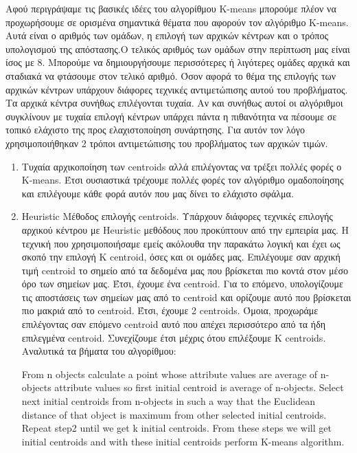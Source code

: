 Αφού περιγράψαμε τις βασικές ιδέες του αλγορίθμου K-means μπορούμε πλέον να προχωρήσουμε σε ορισμένα σημαντικά θέματα που αφορούν τον αλγόριθμο K-means. Αυτά είναι ο αριθμός των ομάδων, η επιλογή των αρχικών κέντρων και ο τρόπος υπολογισμού της απόστασης.Ο τελικός αριθμός των ομάδων στην περίπτωση μας είναι ίσος με 8. Μπορούμε να δημιουργήσουμε περισσότερες ή λιγότερες ομάδες αρχικά και σταδιακά να φτάσουμε στον τελικό αριθμό. Όσον αφορά το θέμα της επιλογής των αρχικών κέντρων υπάρχουν διάφορες τεχνικές αντιμετώπισης αυτού του προβλήματος. Τα αρχικά κέντρα συνήθως επιλέγονται τυχαία. Αν και συνήθως αυτοί οι αλγόριθμοι συγκλίνουν με τυχαία επιλογή κέντρων υπάρχει πάντα η πιθανότητα να πέσουμε σε τοπικό ελάχιστο της προς ελαχιστοποίηση συνάρτησης. Για αυτόν τον λόγο χρησιμοποιήθηκαν 2 τρόποι αντιμετώπισης του προβλήματος των αρχικών τιμών.
\begin{enumerate}
    \item Τυχαία αρχικοποίηση των centroids αλλά επιλέγοντας να τρέξει πολλές φορές ο K-means. Έτσι ουσιαστικά τρέχουμε πολλές φορές τον αλγόριθμο ομαδοποίησης και επιλέγουμε κάθε φορά αυτόν που μας δίνει το ελάχιστο σφάλμα.

    \item Heuristic Μέθοδος επιλογής centroids.
    Υπάρχουν διάφορες τεχνικές επιλογής αρχικού κέντρου με Heuristic μεθόδους που προκύπτουν από την εμπειρία μας.
    Η τεχνική που χρησιμοποιήσαμε εμείς ακόλουθα την παρακάτω λογική και έχει ως σκοπό την επιλογή Κ centroid, όσες και οι ομάδες μας.
    Επιλέγουμε σαν αρχική τιμή centroid το σημείο από τα δεδομένα μας που βρίσκεται πιο κοντά στον μέσο όρο των σημείων μας.
    Έτσι, έχουμε ένα centroid.
    Για το επόμενο, υπολογίζουμε τις αποστάσεις των σημείων μας από το centroid και ορίζουμε αυτό που βρίσκεται πιο μακριά από το centroid.
    Έτσι, έχουμε 2 centroids.
    Όμοια, προχωράμε επιλέγοντας σαν επόμενο centroid αυτό που απέχει περισσότερο από τα ήδη επιλεγμένα centroid.
    Συνεχίζουμε έτσι μέχρις ότου επιλέξουμε K centroids.
    Αναλυτικά τα βήματα του αλγορίθμου:\\
    \begin{minipage}{\linewidth}
    \begin{algorithm}[H]
        From n objects calculate a point whose attribute values are average of n-objects attribute values so first initial centroid is average of n-objects.\;
        Select next initial centroids from n-objects in such a way that the Euclidean distance of that object is maximum from other selected initial centroids.\;
        Repeat step2 until we get k initial centroids.
        From these steps we will get initial centroids and with these initial centroids perform K-means algorithm.\;
    \end{algorithm}
    \end{minipage}
\end{enumerate}

